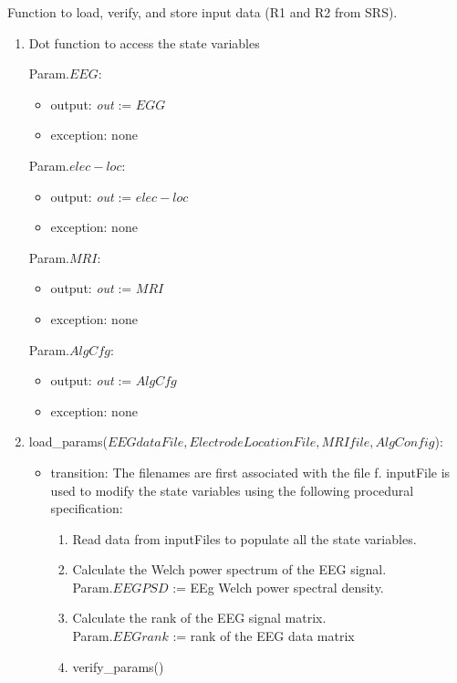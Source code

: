 \documentclass[12pt, titlepage]{article}
\begin{document}
Function to load, verify, and store input data (R1 and R2 from SRS).\\
\begin{enumerate}

\item Dot function to access the state variables

\noindent Param.$EEG$:
\begin{itemize}
\item output: \textit{out} := $EGG$
\item exception: none
\end{itemize}

\noindent Param.$elec-loc$:
\begin{itemize}
\item output: \textit{out} := $elec-loc$
\item exception: none
\end{itemize}

\noindent Param.$MRI$:
\begin{itemize}
\item output: \textit{out} := $MRI$
\item exception: none
\end{itemize}

\noindent Param.$AlgCfg$:
\begin{itemize}
\item output: \textit{out} := $AlgCfg$
\item exception: none
\end{itemize}

\item \noindent load\_params($EEGdataFile, ElectrodeLocationFile, MRIfile, AlgConfig$):
\begin{itemize}
\item transition: The filenames are first associated with the file f.  {inputFile} is used to modify the state variables using the following procedural specification:
\begin{enumerate}
\item Read data  from inputFiles to populate all the state variables.
\item Calculate the Welch power spectrum of the EEG signal. \\
Param.$EEGPSD$ := EEg Welch power spectral density.
\item Calculate the rank of the EEG signal matrix.\\
Param.$EEGrank$ := rank of the EEG data matrix


\item verify\_params()
\end{enumerate}


\end{itemize}
\end{enumerate}
\end{document}
